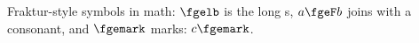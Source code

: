 \documentclass{article}
\begin{document}
Fraktur-style symbols in math: $\fgelb$ is the long s,
$a \fgeF b$ joins with a consonant, and $\fgemark$ marks: $c\fgemark$.
\end{document}
